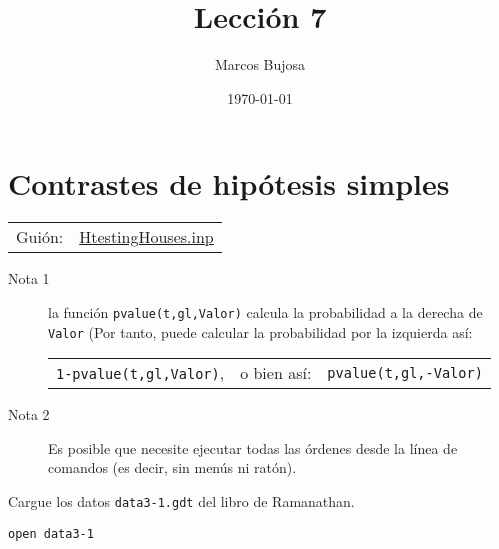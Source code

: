 \documentclass[11pt]{article}
\author{Marcos Bujosa}
\date{\today}
\title{Lección 7}
\begin{document}
\maketitle
\tableofcontents

\clearpage

\section{Contrastes de hipótesis simples}
\label{sec:orgd63c7d0}
\begin{center}
\begin{tabular}{ll}
Guión: & \href{https://github.com/mbujosab/Ectr/tree/master/Practicas/Gretl/scripts/HtestingHouses.inp}{HtestingHouses.inp}\\[0pt]
\end{tabular}
\end{center}

\begin{description}
\item[{Nota 1}] la función \texttt{pvalue(t,gl,Valor)} calcula la probabilidad a
la derecha de \texttt{Valor} (Por tanto, puede calcular la
probabilidad por la izquierda así:
\begin{center}
\begin{tabular}{lll}
\texttt{1-pvalue(t,gl,Valor)}, & o bien así: & \texttt{pvalue(t,gl,-Valor)}\\[0pt]
\end{tabular}
\end{center}

\item[{Nota 2}] Es posible que necesite ejecutar todas las órdenes desde
la línea de comandos (es decir, sin menús ni ratón).
\end{description}

Cargue los datos \texttt{data3-1.gdt} del libro de Ramanathan.
\begin{verbatim}
open data3-1
\end{verbatim}
\end{document}
